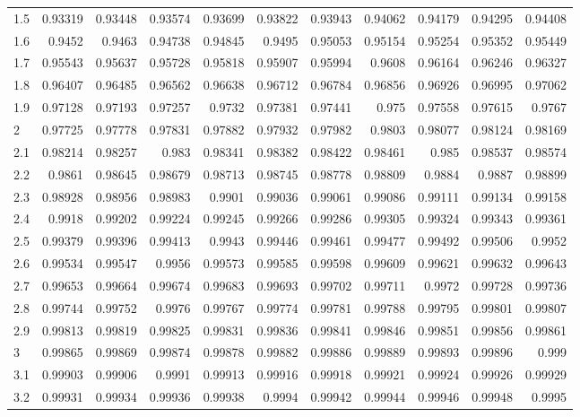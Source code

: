 \documentclass[twoside]{book}
\begin{document}
\begin{table}[!h]
\begin{tabular}{l|*{10}{r}}
1.5 & 0.93319 & 0.93448 & 0.93574 & 0.93699 & 0.93822 & 0.93943 & 0.94062 & 0.94179 & 0.94295 & 0.94408 \\
1.6 & 0.9452  & 0.9463  & 0.94738 & 0.94845 & 0.9495  & 0.95053 & 0.95154 & 0.95254 & 0.95352 & 0.95449 \\
1.7 & 0.95543 & 0.95637 & 0.95728 & 0.95818 & 0.95907 & 0.95994 & 0.9608  & 0.96164 & 0.96246 & 0.96327 \\
1.8 & 0.96407 & 0.96485 & 0.96562 & 0.96638 & 0.96712 & 0.96784 & 0.96856 & 0.96926 & 0.96995 & 0.97062 \\
1.9 & 0.97128 & 0.97193 & 0.97257 & 0.9732  & 0.97381 & 0.97441 & 0.975   & 0.97558 & 0.97615 & 0.9767  \\
2   & 0.97725 & 0.97778 & 0.97831 & 0.97882 & 0.97932 & 0.97982 & 0.9803  & 0.98077 & 0.98124 & 0.98169 \\
2.1 & 0.98214 & 0.98257 & 0.983   & 0.98341 & 0.98382 & 0.98422 & 0.98461 & 0.985   & 0.98537 & 0.98574 \\
2.2 & 0.9861  & 0.98645 & 0.98679 & 0.98713 & 0.98745 & 0.98778 & 0.98809 & 0.9884  & 0.9887  & 0.98899 \\
2.3 & 0.98928 & 0.98956 & 0.98983 & 0.9901  & 0.99036 & 0.99061 & 0.99086 & 0.99111 & 0.99134 & 0.99158 \\
2.4 & 0.9918  & 0.99202 & 0.99224 & 0.99245 & 0.99266 & 0.99286 & 0.99305 & 0.99324 & 0.99343 & 0.99361 \\
2.5 & 0.99379 & 0.99396 & 0.99413 & 0.9943  & 0.99446 & 0.99461 & 0.99477 & 0.99492 & 0.99506 & 0.9952  \\
2.6 & 0.99534 & 0.99547 & 0.9956  & 0.99573 & 0.99585 & 0.99598 & 0.99609 & 0.99621 & 0.99632 & 0.99643 \\
2.7 & 0.99653 & 0.99664 & 0.99674 & 0.99683 & 0.99693 & 0.99702 & 0.99711 & 0.9972  & 0.99728 & 0.99736 \\
2.8 & 0.99744 & 0.99752 & 0.9976  & 0.99767 & 0.99774 & 0.99781 & 0.99788 & 0.99795 & 0.99801 & 0.99807 \\
2.9 & 0.99813 & 0.99819 & 0.99825 & 0.99831 & 0.99836 & 0.99841 & 0.99846 & 0.99851 & 0.99856 & 0.99861 \\
3   & 0.99865 & 0.99869 & 0.99874 & 0.99878 & 0.99882 & 0.99886 & 0.99889 & 0.99893 & 0.99896 & 0.999   \\
3.1 & 0.99903 & 0.99906 & 0.9991  & 0.99913 & 0.99916 & 0.99918 & 0.99921 & 0.99924 & 0.99926 & 0.99929 \\
3.2 & 0.99931 & 0.99934 & 0.99936 & 0.99938 & 0.9994  & 0.99942 & 0.99944 & 0.99946 & 0.99948 & 0.9995  \\

\end{tabular}
\end{table}
\end{document}

